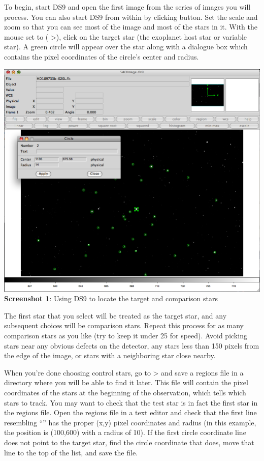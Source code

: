 \documentclass{article}
\begin{document}
To begin, start DS9 and open the first image from the series of images you will process. You can also start DS9 from within \oscaar by clicking  button. Set the scale and zoom so that you can see most of the image and most of the stars in it. With the mouse set to  ( \textgreater  {}), click on the target star (the exoplanet host star or variable star). A green circle will appear over the star along with a dialogue box which contains the pixel coordinates of the circle's center and radius. 
\begin{center}
\includegraphics[scale=0.34]{imgs/ds9.png}
{\small \textbf{Screenshot 1}: Using DS9 to locate the target and comparison stars}
\end{center}	
The first star that you select will be treated as the target star, and any subsequent choices will be comparison stars. Repeat this process for as many comparison stars as you like (try to keep it under 25 for speed). Avoid picking stars near any obvious defects on the detector, any stars less than 150 pixels from the edge of the image, or stars with a neighboring star close nearby. 

When you're done choosing control stars, go to  \textgreater  {} and save a regions file in a directory where you will be able to find it later. This file will contain the pixel coordinates of the stars at the beginning of the observation, which tells \oscaar which stars to track. You may want to check that the test star is in fact the first star in the regions file. Open the regions file in a text editor and check that the first line resembling ``'' has the proper (x,y) pixel coordinates and radius (in this example, the position is (100,600) with a radius of 10). If the first circle coordinate line does not point to the target star, find the circle coordinate that does, move that line to the top of the list, and save the file.
\end{document}
